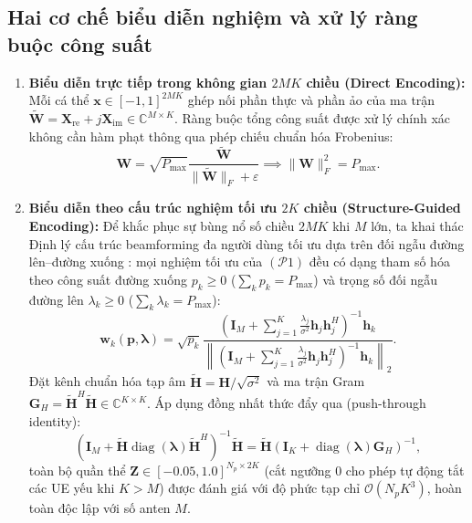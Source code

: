 \documentclass[12pt, a4paper]{article}
\begin{document}
\subsection{Hai cơ chế biểu diễn nghiệm và xử lý ràng buộc công suất}
\begin{enumerate}
    \item \textbf{Biểu diễn trực tiếp trong không gian $2MK$ chiều (Direct Encoding):} Mỗi cá thể $\mathbf{x} \in [-1, 1]^{2MK}$ ghép nối phần thực và phần ảo của ma trận $\tilde{\mathbf{W}} = \mathbf{X}_{\text{re}} + j\mathbf{X}_{\text{im}} \in \mathbb{C}^{M \times K}$. Ràng buộc tổng công suất được xử lý chính xác không cần hàm phạt thông qua phép chiếu chuẩn hóa Frobenius:
    \begin{equation}
        \mathbf{W} = \sqrt{P_{\max}} \frac{\tilde{\mathbf{W}}}{\|\tilde{\mathbf{W}}\|_F + \varepsilon} \implies \|\mathbf{W}\|_F^2 = P_{\max}.
    \end{equation}
    \item \textbf{Biểu diễn theo cấu trúc nghiệm tối ưu $2K$ chiều (Structure-Guided Encoding):} Để khắc phục sự bùng nổ số chiều $2MK$ khi $M$ lớn, ta khai thác Định lý cấu trúc beamforming đa người dùng tối ưu dựa trên đối ngẫu đường lên--đường xuống \cite{bjornson2014}: mọi nghiệm tối ưu của $(\mathcal{P}1)$ đều có dạng tham số hóa theo công suất đường xuống $p_k \ge 0$ ($\sum_k p_k = P_{\max}$) và trọng số đối ngẫu đường lên $\lambda_k \ge 0$ ($\sum_k \lambda_k = P_{\max}$):
    \begin{equation}
        \mathbf{w}_k(\mathbf{p}, \boldsymbol{\lambda}) = \sqrt{p_k} \frac{\left(\mathbf{I}_M + \sum_{j=1}^{K} \frac{\lambda_j}{\sigma^2}\mathbf{h}_j\mathbf{h}_j^H\right)^{-1}\mathbf{h}_k}{\left\|\left(\mathbf{I}_M + \sum_{j=1}^{K} \frac{\lambda_j}{\sigma^2}\mathbf{h}_j\mathbf{h}_j^H\right)^{-1}\mathbf{h}_k\right\|_2}.
    \end{equation}
    Đặt kênh chuẩn hóa tạp âm $\tilde{\mathbf{H}} = \mathbf{H}/\sqrt{\sigma^2}$ và ma trận Gram $\mathbf{G}_H = \tilde{\mathbf{H}}^H\tilde{\mathbf{H}} \in \mathbb{C}^{K \times K}$. Áp dụng đồng nhất thức đẩy qua (push-through identity):
    \begin{equation}
        \left(\mathbf{I}_M + \tilde{\mathbf{H}}\operatorname{diag}(\boldsymbol{\lambda})\tilde{\mathbf{H}}^H\right)^{-1}\tilde{\mathbf{H}} = \tilde{\mathbf{H}}\left(\mathbf{I}_K + \operatorname{diag}(\boldsymbol{\lambda})\mathbf{G}_H\right)^{-1},
    \end{equation}
    toàn bộ quần thể $\mathbf{Z} \in [-0.05, 1.0]^{N_p \times 2K}$ (cắt ngưỡng $0$ cho phép tự động tắt các UE yếu khi $K > M$) được đánh giá với độ phức tạp chỉ $\mathcal{O}(N_p K^3)$, hoàn toàn độc lập với số anten $M$.
\end{enumerate}
\end{document}
